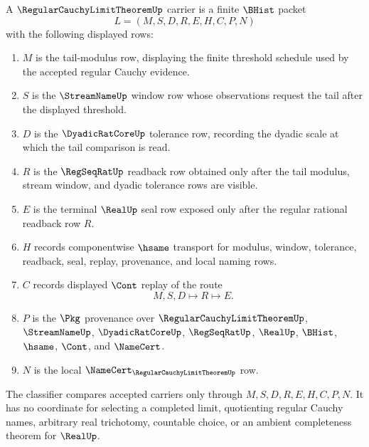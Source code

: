 \begin{definition}
\label{def:regular-cauchy-limit-theorem-carrier}
A $\RegularCauchyLimitTheoremUp$ carrier is a finite $\BHist$ packet
$$
L=(M,S,D,R,E,H,C,P,N)
$$
with the following displayed rows:
\begin{enumerate}
\item $M$ is the tail-modulus row, displaying the finite threshold schedule used by the accepted regular Cauchy evidence.
\item $S$ is the $\StreamNameUp$ window row whose observations request the tail after the displayed threshold.
\item $D$ is the $\DyadicRatCoreUp$ tolerance row, recording the dyadic scale at which the tail comparison is read.
\item $R$ is the $\RegSeqRatUp$ readback row obtained only after the tail modulus, stream window, and dyadic tolerance rows are visible.
\item $E$ is the terminal $\RealUp$ seal row exposed only after the regular rational readback row $R$.
\item $H$ records componentwise $\hsame$ transport for modulus, window, tolerance, readback, seal, replay, provenance, and local naming rows.
\item $C$ records displayed $\Cont$ replay of the route
$$
M,S,D \longmapsto R \longmapsto E .
$$
\item $P$ is the $\Pkg$ provenance over $\RegularCauchyLimitTheoremUp$, $\StreamNameUp$, $\DyadicRatCoreUp$, $\RegSeqRatUp$, $\RealUp$, $\BHist$, $\hsame$, $\Cont$, and $\NameCert$.
\item $N$ is the local $\NameCert_{\RegularCauchyLimitTheoremUp}$ row.
\end{enumerate}
The classifier compares accepted carriers only through $M,S,D,R,E,H,C,P,N$. It has no coordinate for selecting a completed limit, quotienting regular Cauchy names, arbitrary real trichotomy, countable choice, or an ambient completeness theorem for $\RealUp$.
\end{definition}

